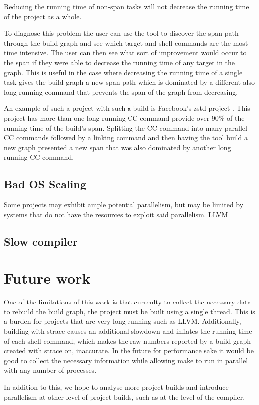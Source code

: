 \documentclass[sigplan,10pt,review,authorversion]{acmart}\settopmatter{printfolios=true,printccs=false,printacmref=false}
\begin{document}
Reducing the running time of non-span tasks will not decrease the running time of the project as
a whole.

To diagnose this problem the user can use the tool to discover the span path through the build
graph and see which target and shell commands are the most time intensive.  The user can then see
what sort of improvement would occur to the span if they were able to decrease the running
time of any target in the graph.  This is useful in the case where decreasing the running time
of a single task gives the build graph a new span path which is dominated by a different also
long running command that prevents the span of the graph from decreasing.

An example of such a project with such a build is Facebook's zstd project \cite{}.  This project
has more than one long running CC command provide over 90\% of the running time of the build's
span.  Splitting the CC command into many parallel CC commands followed by a linking command
and then having the tool build a new graph presented a new span that was also dominated by
another long running CC command.

\subsection{Bad OS Scaling}

Some projects may exhibit ample potential parallelism, but may be limited by systems that do not
have the resources to exploit said parallelism.  LLVM \cite{} 


\subsection{Slow compiler}

\section{Future work}

One of the limitations of this work is that currenlty to collect the necessary data to rebuild
the build graph, the project must be built using a single thread.  This is a burden for projects
that are very long running such as LLVM.  Additionally, building with strace causes an additional
slowdown and inflates the running time of each shell command, which makes the raw numbers
reported by a build graph created with strace on, inaccurate.  In the future for performance sake
it would be good to collect the necessary information while allowing make to run in parallel with
any number of processes.

In addition to this, we hope to analyse more project builds and introduce parallelism at other
level of project builds, such as at the level of the compiler.  
\end{document}
